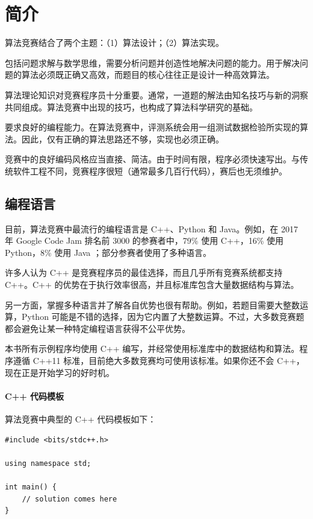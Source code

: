 \chapter{简介}

算法竞赛结合了两个主题：（1）算法设计；（2）算法实现。

包括问题求解与数学思维，需要分析问题并创造性地解决问题的能力。用于解决问题的算法必须既正确又高效，而题目的核心往往正是设计一种高效算法。

算法理论知识对竞赛程序员十分重要。通常，一道题的解法由知名技巧与新的洞察共同组成。算法竞赛中出现的技巧，也构成了算法科学研究的基础。

要求良好的编程能力。在算法竞赛中，评测系统会用一组测试数据检验所实现的算法。因此，仅有正确的算法思路还不够，实现也必须正确。

竞赛中的良好编码风格应当直接、简洁。由于时间有限，程序必须快速写出。与传统软件工程不同，竞赛程序很短（通常最多几百行代码），赛后也无须维护。

\section{编程语言}


目前，算法竞赛中最流行的编程语言是 C++、Python 和 Java。例如，在 2017 年 Google Code Jam 排名前 3000 的参赛者中，79\% 使用 C++，16\% 使用 Python，8\% 使用 Java \cite{goo17}；部分参赛者使用了多种语言。

许多人认为 C++ 是竞赛程序员的最佳选择，而且几乎所有竞赛系统都支持 C++。C++ 的优势在于执行效率很高，并且标准库包含大量数据结构与算法。

另一方面，掌握多种语言并了解各自优势也很有帮助。例如，若题目需要大整数运算，Python 可能是不错的选择，因为它内置了大整数运算。不过，大多数竞赛题都会避免让某一种特定编程语言获得不公平优势。

本书所有示例程序均使用 C++ 编写，并经常使用标准库中的数据结构和算法。程序遵循 C++11 标准，目前绝大多数竞赛均可使用该标准。如果你还不会 C++，现在正是开始学习的好时机。

\subsubsection{C++ 代码模板}

算法竞赛中典型的 C++ 代码模板如下：

\begin{lstlisting}
#include <bits/stdc++.h>

using namespace std;

int main() {
    // solution comes here
}
\end{lstlisting}

